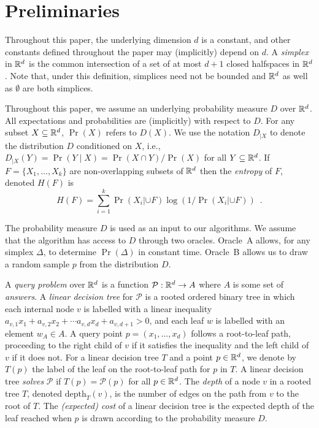 \documentclass{patmorin}
\newcommand{\depth}{\mathrm{depth}}
\begin{document}
\section{Preliminaries}

Throughout this paper, the underlying dimension $d$ is a constant, and
other constants defined throughout the paper may (implicitly) depend
on $d$.  A \emph{simplex} in $\mathbb{R}^d$ is the common intersection of a
set of at most $d+1$ closed halfspaces in $\mathbb{R}^d$. Note that, under this
definition, simplices need not be bounded and $\mathbb{R}^d$ as well as $\emptyset$ are both simplices.

Throughout this paper, we assume an underlying probability measure
$D$ over $\mathbb{R}^d$.  All expectations and probabilities are (implicitly)
with respect to $D$.  For any subset $X\subseteq\mathbb{R}^d$, $\Pr(X)$ refers
to $D(X)$.  We use the notation $D_{|X}$ to denote the distribution $D$
conditioned on $X$, i.e., $D_{|X}(Y)=\Pr(Y\mid X)=\Pr(X\cap Y)/\Pr(X)$
for all $Y\subseteq\mathbb{R}^d$.  If $F=\{X_1,\ldots,X_k\}$ are non-overlapping
subsets of $\mathbb{R}^d$ then the \emph{entropy} of $F$, denoted $H(F)$ is
\[
    H(F) = \sum_{i=1}^k \Pr(X_i|\cup F)\log(1/\Pr(X_i|\cup F)) \enspace .
\]

The probability measure $D$ is used as an input to our algorithms.
We assume that the algorithm has access to $D$ through two oracles.
Oracle~A allows, for any simplex $\Delta$, to determine $\Pr(\Delta)$
in constant time.  Oracle~B allows us to draw a random sample $p$ from
the distribution $D$.

A \emph{query problem} over $\mathbb{R}^d$ is a function
$\mathcal{P}:\mathbb{R}^d\rightarrow A$ where $A$ is some set of \emph{answers}.
A \emph{linear decision tree} for $\mathcal{P}$ is a rooted ordered
binary tree in which each internal node $v$ is labelled with a linear
inequality $a_{v,1}x_1 + a_{v,2}x_2 + \cdots a_{v,d}x_d + a_{v,d+1} > 0$,
and each leaf $w$ is labelled with an element $w_A\in A$.  A query point
$p=(x_1,\ldots,x_d)$ follows a root-to-leaf path, proceeding to the right
child of $v$ if it satisfies the inequality and the left child of $v$
if it does not.  For a linear decision tree $T$ and a point $p\in\mathbb{R}^d$,
we denote by $T(p)$ the label of the leaf on the root-to-leaf path
for $p$ in $T$.  A linear decision tree \emph{solves} $\mathcal{P}$ if
$T(p)=\mathcal{P}(p)$ for all $p\in\mathbb{R}^d$. The \emph{depth} of a node $v$
in a rooted tree $T$, denoted $\depth_T(v)$, is the number of edges on
the path from $v$ to the root of $T$.  The \emph{(expected) cost} of a
linear decision tree is the expected depth of the leaf reached when $p$
is drawn according to the probability measure $D$.
\end{document}
